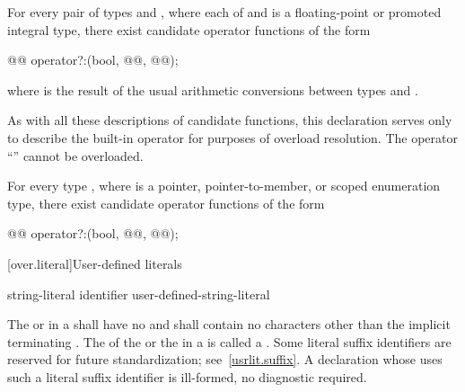\pnum
For every pair of types  and ,
where each of  and  is a
floating-point or promoted integral type,
there exist candidate operator functions of the form
\begin{codeblock}
@@      operator?:(bool, @@, @@);
\end{codeblock}
where
is the result of the usual arithmetic conversions between types
and
.
\begin{note}
As with all these descriptions of candidate functions, this declaration serves
only to describe the built-in operator for purposes of overload resolution.
The operator
``''
cannot be overloaded.
\end{note}

\pnum
For every type
,
where
is a pointer, pointer-to-member, or scoped enumeration type, there exist candidate operator
functions of the form
\begin{codeblock}
@@       operator?:(bool, @@, @@);
\end{codeblock}%

[over.literal]{User-defined literals}%
%

\begin{bnf}
\br
     string-literal identifier\br
     user-defined-string-literal
\end{bnf}

\pnum
The  or 
in a  shall have no
 and shall contain no characters other than the
implicit terminating .
The  of the  or
the  in a  is called a
.
Some literal suffix identifiers are reserved for future standardization;
see~\ref{usrlit.suffix}.  A declaration whose  uses
such a literal suffix identifier is ill-formed, no diagnostic required.


